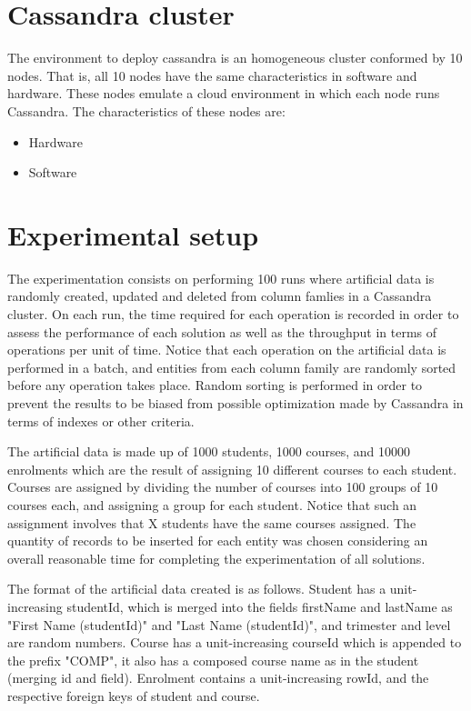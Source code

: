 \section{Cassandra cluster}

The environment to deploy cassandra is  an homogeneous cluster conformed by 10
nodes. That is, all 10 nodes have the same characteristics in software and
hardware. These nodes emulate a cloud environment in which each node runs
Cassandra. The characteristics of these nodes are:

\begin{itemize}
  \item Hardware
  \item Software
\end{itemize}




\section{Experimental setup}\label{s:exp:setup}


 The experimentation consists
on performing 100 runs where artificial data is randomly created, updated and
deleted from column famlies in a Cassandra cluster.
On each run, the time required for each operation is recorded in order to assess
the performance of each solution as well as the throughput in terms of
operations per unit of time. Notice that each operation on the artificial data 
is performed in a batch, and entities from each column family are randomly
sorted before any operation takes place. Random sorting is performed in order to
prevent the results to be biased from possible optimization made by Cassandra in
terms of indexes or other criteria.
		
The artificial data is made up of 1000 students, 1000 courses, and 10000
enrolments which are the result of assigning 10 different courses to each
student. Courses are assigned by dividing the number of courses
into 100 groups of 10 courses each, and assigning a group for each student.
Notice that such an assignment involves that X students have the same courses
assigned. The quantity of records to be inserted for each entity was chosen
considering an overall reasonable time for completing the experimentation of all
solutions.
		
The format of the artificial data created is as follows. Student has a
unit-increasing studentId, which is merged into the fields firstName and
lastName as "First Name (studentId)" and "Last Name (studentId)", and trimester
and level are random numbers. Course has a   unit-increasing courseId which is
appended to the prefix "COMP", it also has a composed course name as in
the student (merging id and field). Enrolment contains a unit-increasing rowId, and the
respective foreign keys of student and course.
		
